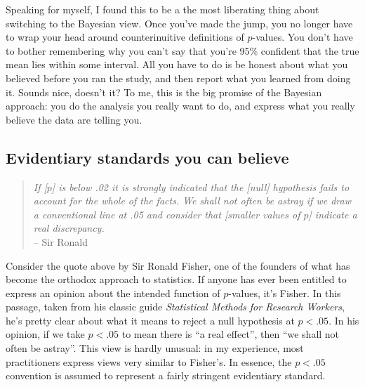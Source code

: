 Speaking for myself, I found this to be a the most liberating thing about switching to the Bayesian view. Once you've made the jump, you no longer have to wrap your head around counterinuitive definitions of $p$-values. You don't have to bother remembering why you can't say that you're 95\% confident that the true mean lies within some interval. All you have to do is be honest about what you believed before you ran the study, and then report what you learned from doing it. Sounds nice, doesn't it? To me, this is the big promise of the Bayesian approach: you do the analysis you really want to do, and express what you really believe the data are telling you.



\subsection{Evidentiary standards you can believe}



\begin{quote}
{\it If [$p$] is below .02 it is strongly indicated that the [null] hypothesis fails to account for the whole of the facts. We shall not often be astray if we draw a conventional line at .05 and consider that [smaller values of $p$] indicate a real discrepancy.}\\
\hspace*{2cm} -- Sir Ronald 
\end{quote}


Consider the quote above by Sir Ronald Fisher, one of the founders of what has become the orthodox approach to statistics. If anyone has ever been entitled to express an opinion about the intended function of $p$-values, it's Fisher. In this passage, taken from his classic guide {\it Statistical Methods for Research Workers}, he's pretty clear about what it means to reject a null hypothesis at $p<.05$. In his opinion, if we take $p<.05$ to mean there is ``a real effect'', then ``we shall not often be astray''. This view is hardly unusual: in my experience, most practitioners express views very similar to Fisher's. In essence, the $p<.05$ convention is assumed to represent a fairly stringent evidentiary standard.

